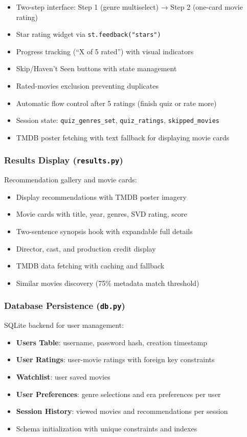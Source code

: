 \documentclass[11pt,a4paper]{article}
\begin{document}
\begin{itemize}
    \item Two-step interface: Step 1 (genre multiselect) → Step 2 (one-card movie rating)
    \item Star rating widget via \texttt{st.feedback("stars")}
    \item Progress tracking (``X of 5 rated'') with visual indicators
    \item Skip/Haven't Seen buttons with state management
    \item Rated-movies exclusion preventing duplicates
    \item Automatic flow control after 5 ratings (finish quiz or rate more)
    \item Session state: \texttt{quiz\_genres\_set}, \texttt{quiz\_ratings}, \texttt{skipped\_movies}
    \item TMDB poster fetching with text fallback for displaying movie cards
\end{itemize}

\subsubsection{Results Display (\texttt{results.py})}

Recommendation gallery and movie cards:

\begin{itemize}
    \item Display recommendations with TMDB poster imagery
    \item Movie cards with title, year, genres, SVD rating, score
    \item Two-sentence synopsis hook with expandable full details
    \item Director, cast, and production credit display
    \item TMDB data fetching with caching and fallback
    \item Similar movies discovery (75\% metadata match threshold)
\end{itemize}

\subsubsection{Database Persistence (\texttt{db.py})}

SQLite backend for user management:

\begin{itemize}
    \item \textbf{Users Table}: username, password hash, creation timestamp
    \item \textbf{User Ratings}: user-movie ratings with foreign key constraints
    \item \textbf{Watchlist}: user saved movies
    \item \textbf{User Preferences}: genre selections and era preferences per user
    \item \textbf{Session History}: viewed movies and recommendations per session
    \item Schema initialization with unique constraints and indexes
\end{itemize}
\end{document}
